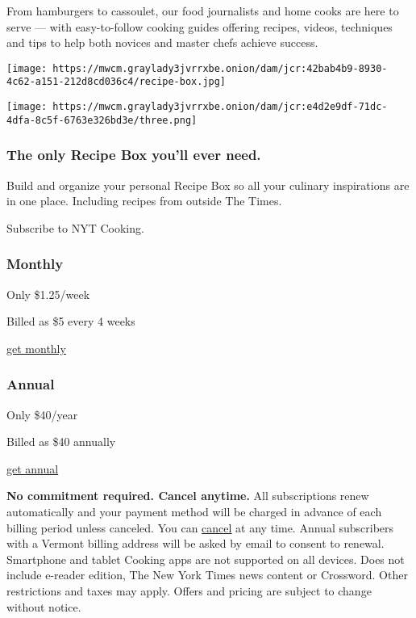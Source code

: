 From hamburgers to cassoulet, our food journalists and home cooks are
here to serve --- with easy-to-follow cooking guides offering recipes,
videos, techniques and tips to help both novices and master chefs
achieve success.

\texttt{[image: https://mwcm.graylady3jvrrxbe.onion/dam/jcr:42bab4b9-8930-4c62-a151-212d8cd036c4/recipe-box.jpg]}

\texttt{[image: https://mwcm.graylady3jvrrxbe.onion/dam/jcr:e4d2e9df-71dc-4dfa-8c5f-6763e326bd3e/three.png]}

\hypertarget{the-only-recipe-box-youll-ever-need}{%
\subsubsection{The only Recipe Box you'll ever
need.}\label{the-only-recipe-box-youll-ever-need}}

Build and organize your personal Recipe Box so all your culinary
inspirations are in one place. Including recipes from outside The Times.

Subscribe to NYT Cooking.

\hypertarget{monthly}{%
\subsubsection{Monthly}\label{monthly}}

Only \$1.25/week

Billed as \$5 every 4 weeks

\href{https://myaccount.nytimes3xbfgragh.onion/get-started/auth}{get
monthly}

\hypertarget{annual}{%
\subsubsection{Annual}\label{annual}}

Only \$40/year

Billed as \$40 annually

\href{https://myaccount.nytimes3xbfgragh.onion/get-started/auth}{get
annual}

\textbf{No commitment required. Cancel anytime.} All subscriptions renew
automatically and your payment method will be charged in advance of each
billing period unless canceled. You can
\href{https://help.nytimes3xbfgragh.onion/hc/en-us/articles/115014893968-Terms-of-sale\#cancel}{cancel}
at any time. Annual subscribers with a Vermont billing address will be
asked by email to consent to renewal. Smartphone and tablet Cooking apps
are not supported on all devices. Does not include e-reader edition, The
New York Times news content or Crossword. Other restrictions and taxes
may apply. Offers and pricing are subject to change without notice.

